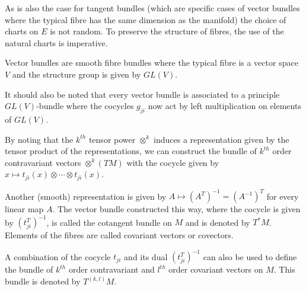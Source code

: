 	\begin{remark}
		As is also the case for tangent bundles (which are specific cases of vector bundles where the typical fibre has the same dimension as the manifold) the choice of charts on $E$ is not random. To preserve the structure of fibres, the use of the natural charts is imperative.
	\end{remark}
	\begin{remark}
		Vector bundles are smooth fibre bundles where the typical fibre is a vector space $V$ and the structure group is given by $GL(V)$.
	\end{remark}
	
	\begin{remark}
		\label{manifolds:vector_principal_correspondence}
		It should also be noted that every vector bundle is associated to a principle $GL(V)$-bundle where the cocycles $g_{ji}$ now act by left multiplication on elements of $GL(V)$.
	\end{remark}

	\begin{example}
		By noting that the $k^{th}$ tensor power $\otimes^k$ induces a representation given by the tensor product of the representations, we can construct the bundle of $k^{th}$ order contravariant vectors $\otimes^k(TM)$ with the cocycle given by $x\mapsto t_{ji}(x)\otimes\cdots\otimes t_{ji}(x)$.
	\end{example}
	\begin{example}\label{manifolds:cotangent_bundle}
		Another (smooth) representation is given by $A\mapsto (A^T)^{-1}=(A^{-1})^T$ for every linear map $A$. The vector bundle constructed this way, where the cocycle is given by $(t_{ji}^T)^{-1}$, is called the cotangent bundle on $M$ and is denoted by $T^*M$. Elements of the fibres are called covariant vectors or covectors.
	\end{example}
	\begin{notation}
		A combination of the cocycle $t_{ji}$ and its dual $(t_{ji}^T)^{-1}$ can also be used to define the bundle of $k^{th}$ order contravariant and $l^{th}$ order covariant vectors on $M$. This bundle is denoted by $T^{(k, l)}M$.
	\end{notation}
	

